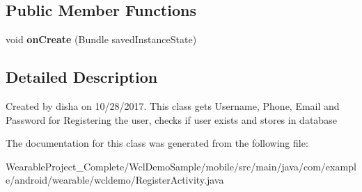\subsection*{Public Member Functions}
\begin{DoxyCompactItemize}
\item 
void {\bfseries on\+Create} (Bundle saved\+Instance\+State)\hypertarget{classcom_1_1example_1_1android_1_1wearable_1_1wcldemo_1_1RegisterActivity_a97570cea5b0a43d7c1ae2bc29afba697}{}\label{classcom_1_1example_1_1android_1_1wearable_1_1wcldemo_1_1RegisterActivity_a97570cea5b0a43d7c1ae2bc29afba697}

\end{DoxyCompactItemize}


\subsection{Detailed Description}
Created by disha on 10/28/2017. This class gets Username, Phone, Email and Password for Registering the user, checks if user exists and stores in database 

The documentation for this class was generated from the following file\+:\begin{DoxyCompactItemize}
\item 
Wearable\+Project\+\_\+\+Complete/\+Wcl\+Demo\+Sample/mobile/src/main/java/com/example/android/wearable/wcldemo/Register\+Activity.\+java\end{DoxyCompactItemize}
